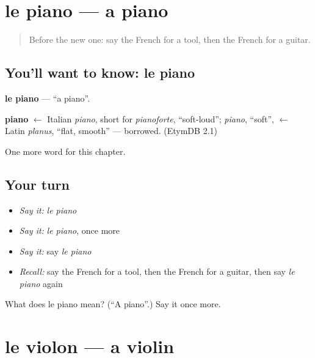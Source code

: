 \section[le piano]{le piano — a piano}

\label{lesson:FR-C256-piano}



\begin{quote}
Before the new one: say the French for a tool, then the French for a guitar.
\end{quote}

\subsection*{You'll want to know: le piano}
\textbf{le piano} — \textquotedblleft{}a piano\textquotedblright{}.

\begin{cousinweb}
\textbf{piano} $\leftarrow$ Italian \emph{piano}, short for \emph{pianoforte}, \textquotedblleft{}soft-loud\textquotedblright{}; \emph{piano}, \textquotedblleft{}soft\textquotedblright{}, $\leftarrow$ Latin \emph{planus}, \textquotedblleft{}flat, smooth\textquotedblright{} — borrowed. (EtymDB 2.1)
\end{cousinweb}

\begin{grammarlens}[title={What you've built}]
One more word for this chapter.
\end{grammarlens}

\subsection*{Your turn}
\begin{itemize}
\raggedright
  \item \emph{Say it:} \emph{le piano}
  \item \emph{Say it:} \emph{le piano}, once more
  \item \emph{Say it:} say \emph{le piano}
  \item \emph{Recall:} say the French for a tool, then the French for a guitar, then say \emph{le piano} again
\end{itemize}

\begin{tcolorbox}[breakable,colback=teal!4,colframe=teal!35!black,title={Before you move on}]
What does le piano mean? (\textquotedblleft{}A piano\textquotedblright{}.) Say it once more.
\end{tcolorbox}
\section[le violon]{le violon — a violin}

